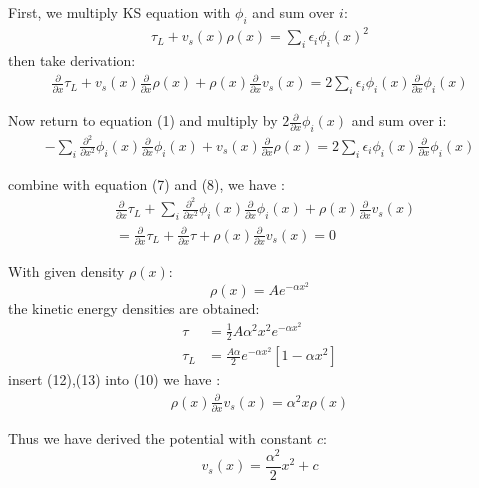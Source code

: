\documentclass[notitlepage]{revtex4-1}
\begin{document}
\begin{CJK}{UTF8}{bsmi}
\begin{enumerate}
		 First, we multiply KS equation with $\phi_i$ and sum over $i$:
		\begin{align}
			\tau_L + v_s(x)\rho(x) = \sum_i \epsilon_i \phi_i(x)^2 
		\end{align}		
		then take derivation: 
		\begin{align}
			\frac{\partial}{\partial x}\tau_L + v_s(x)\frac{\partial}{\partial x}\rho(x) + \rho(x) \frac{\partial}{\partial x} v_s(x)= 2\sum_i \epsilon_i \phi_i(x) \frac{\partial}{\partial x} \phi_i(x) 
		\end{align}			 
		
		Now return to equation (1) and multiply by $2\frac{\partial}{\partial x}\phi_i(x)$ and sum over i:
		\begin{align}
			-\sum_{i} \frac{\partial^2}{\partial x^2} \phi_i(x) \frac{\partial}{\partial x} \phi_i(x) + v_s(x)\frac{\partial}{\partial x}\rho(x) = 2\sum_i \epsilon_i \phi_i(x) \frac{\partial}{\partial x} \phi_i(x)
		\end{align}
		
		combine with equation (7) and (8), we have :
		\begin{align}
			&\frac{\partial}{\partial x} \tau_L + \sum_i \frac{\partial^2}{\partial x^2} \phi_i(x) \frac{\partial}{\partial x} \phi_i(x) + \rho(x) \frac{\partial }{\partial x} v_s(x) \\
			&=\frac{\partial}{\partial x} \tau_L + \frac{\partial}{\partial x} \tau + \rho(x) \frac{\partial }{\partial x} v_s(x)  = 0 
		\end{align} 
		
		With given density $\rho(x)$:
		\begin{equation}
			\rho(x) = Ae^{-\alpha x^2}
		\end{equation}
		the kinetic energy densities are obtained:
		\begin{align}
			\tau &= \frac{1}{2} A \alpha^2 x^2 e^{-\alpha x^2} \\
			\tau_L &= \frac{A\alpha}{2} e^{-\alpha x^2} \left[ 1 - \alpha x^2 \right]
		\end{align}
		insert (12),(13) into (10) we have :
		\begin{align}
			\rho(x) \frac{\partial}{\partial x} v_s(x) = \alpha^2 x \rho(x)
		\end{align}
		
		Thus we have derived the potential with constant $c$:
		\begin{equation}
			v_s(x) = \frac{\alpha^2}{2} x^2 + c
		\end{equation}
		

\end{enumerate}
\end{CJK}
\end{document}
